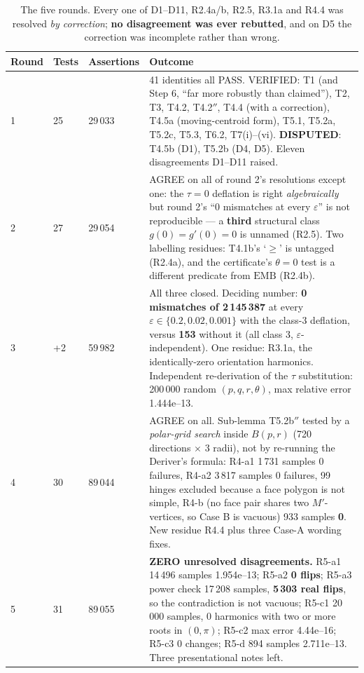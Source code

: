 \documentclass[10pt,a4paper]{article}
\begin{document}
\begin{table}[h]\centering\small
\begin{tabular}{@{}lllp{72mm}@{}}
\toprule
Round & Tests & Assertions & Outcome \\
\midrule
1 & 25 & 29\,033 & 41 identities all PASS. VERIFIED: T1 (and Step 6, ``far more robustly than claimed''), T2, T3, T4.2, T4.2$''$, T4.4 (with a correction), T4.5a (moving-centroid form), T5.1, T5.2a, T5.2c, T5.3, T6.2, T7(i)--(vi). \textbf{DISPUTED}: T4.5b (D1), T5.2b (D4, D5). Eleven disagreements D1--D11 raised. \\
2 & 27 & 29\,054 & AGREE on all of round 2's resolutions except one: the $\tau=0$ deflation is right \emph{algebraically} but round 2's ``0 mismatches at every $\varepsilon$'' is not reproducible --- a \textbf{third} structural class $g(0)=g'(0)=0$ is unnamed (R2.5). Two labelling residues: T4.1b's `$\ge$' is untagged (R2.4a), and the certificate's $\theta=0$ test is a different predicate from $\mathrm{EMB}$ (R2.4b). \\
3 & +2 & 59\,982 & All three closed. Deciding number: \textbf{0 mismatches of 2\,145\,387} at every $\varepsilon\in\{0.2,0.02,0.001\}$ with the class-3 deflation, versus \textbf{153} without it (all class 3, $\varepsilon$-independent). One residue: R3.1a, the identically-zero orientation harmonics. Independent re-derivation of the $\tau$ substitution: 200\,000 random $(p,q,r,\theta)$, max relative error 1.444e--13. \\
4 & 30 & 89\,044 & AGREE on all. Sub-lemma T5.2b$''$ tested by a \emph{polar-grid search} inside $B(p,r)$ (720 directions $\times$ 3 radii), not by re-running the Deriver's formula: R4-a1 1\,731 samples 0 failures, R4-a2 3\,817 samples 0 failures, 99 hinges excluded because a face polygon is not simple, R4-b (no face pair shares two $M'$-vertices, so Case B is vacuous) 933 samples \textbf{0}. New residue R4.4 plus three Case-A wording fixes. \\
5 & 31 & 89\,055 & \textbf{ZERO unresolved disagreements.} R5-a1 14\,496 samples 1.954e--13; R5-a2 \textbf{0 flips}; R5-a3 power check 17\,208 samples, \textbf{5\,303 real flips}, so the contradiction is not vacuous; R5-c1 20\,000 samples, 0 harmonics with two or more roots in $(0,\pi)$; R5-c2 max error 4.44e--16; R5-c3 0 changes; R5-d 894 samples 2.711e--13. Three presentational notes left. \\
\bottomrule
\end{tabular}
\caption{The five rounds. Every one of D1--D11, R2.4a/b, R2.5, R3.1a and R4.4 was resolved
\emph{by correction}; \textbf{no disagreement was ever rebutted}, and on D5 the correction was
incomplete rather than wrong.}
\end{table}
\end{document}
